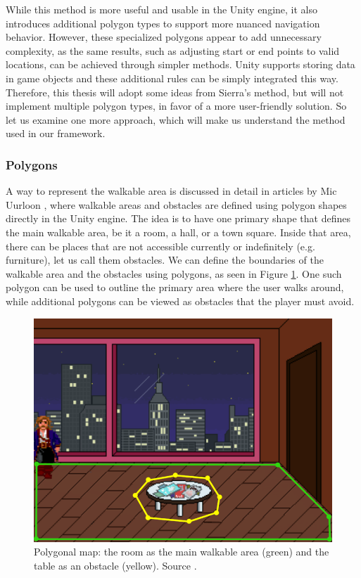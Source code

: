 While this method is more useful and usable in the Unity engine, it also introduces additional polygon types to support more nuanced navigation behavior. However, these specialized polygons appear to add unnecessary complexity, as the same results, such as adjusting start or end points to valid locations, can be achieved through simpler methods. Unity supports storing data in game objects and these additional rules can be simply integrated this way. Therefore, this thesis will adopt some ideas from Sierra’s method, but will not implement multiple polygon types, in favor of a more user-friendly solution. So let us examine one more approach, which will make us understand the method used in our framework.

\subsubsection{Polygons}
\label{Analysis:Polygon}
A way to represent the walkable area is discussed in detail in articles by Mic Uurloon \cite{Uurloon1}\cite{Uurloon2}, where walkable areas and obstacles are defined using polygon shapes directly in the Unity engine. The idea is to have one primary shape that defines the main walkable area, be it a room, a hall, or a town square. Inside that area, there can be places that are not accessible currently or indefinitely (e.g. furniture), let us call them obstacles. We can define the boundaries of the walkable area and the obstacles using polygons, as seen in Figure \ref{fig:WS:Poly}. One such polygon can be used to outline the primary area where the user walks around, while additional polygons can be viewed as obstacles that the player must avoid.

\begin{figure}[H]
\centering
\includegraphics[width=.7\linewidth]{img/WS-polygons4.png}
\caption{Polygonal map: the room as the main walkable area (green) and the table as an obstacle (yellow). Source \cite{Uurloon1}.}
\label{fig:WS:Poly}
\end{figure}

